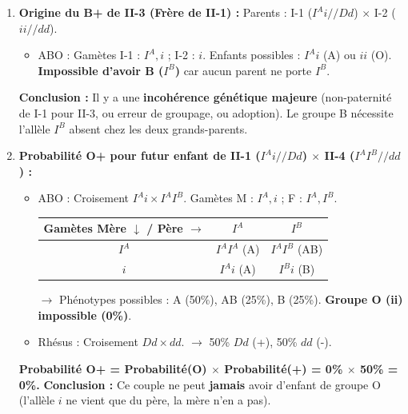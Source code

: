 \documentclass[11pt]{article}
\begin{document}
\begin{exoresolu}
\begin{enumerate}
\begin{itemize}
\begin{itemize}
                \item ABO : Phénotype B. Parents : $I^A i \times I^A I^B$. Pour être B, il faut $I^B$ (venant de II-4) et $i$ (venant de II-1). $\rightarrow$ \textbf{$I^B i$} (Certitude).
                \item Rhésus : Phénotype +. Parents : $Dd \times dd$. Enfant + $\rightarrow$ $Dd$. $\rightarrow$ \textbf{$Dd$}.
            \end{itemize}
            $\rightarrow$ \textbf{III-2 : $I^B i // Dd$}.
    \end{itemize}
    \item \textbf{Origine du B+ de II-3 (Frère de II-1) :} 
    Parents : I-1 ($I^A i // Dd$) $\times$ I-2 ($ii // dd$).
    \begin{itemize}
        \item ABO : Gamètes I-1 : $I^A, i$ ; I-2 : $i$. Enfants possibles : $I^A i$ (A) ou $ii$ (O). \textbf{Impossible d'avoir B ($I^B$)} car aucun parent ne porte $I^B$.
    \end{itemize}
    \textbf{Conclusion :} Il y a une \textbf{incohérence génétique majeure} (non-paternité de I-1 pour II-3, ou erreur de groupage, ou adoption). Le groupe B nécessite l'allèle $I^B$ absent chez les deux grands-parents.
    \item \textbf{Probabilité O+ pour futur enfant de II-1 ($I^A i // Dd$) $\times$ II-4 ($I^A I^B // dd$) :}
    \begin{itemize}
        \item ABO : Croisement $I^A i \times I^A I^B$. Gamètes M : $I^A, i$ ; F : $I^A, I^B$.
            \begin{center}
            \begin{tabular}{|c|c|c|}\hline 
            \textbf{Gamètes Mère $\downarrow$ / Père $\rightarrow$} & \textbf{$I^A$} & \textbf{$I^B$} \\ \hline 
            \textbf{$I^A$} & $I^A I^A$ (A) & $I^A I^B$ (AB) \\ \hline 
            \textbf{$i$} & $I^A i$ (A) & $I^B i$ (B) \\ \hline \end{tabular}
            \end{center}
            $\rightarrow$ Phénotypes possibles : A (50\%), AB (25\%), B (25\%). \textbf{Groupe O (ii) impossible (0\%)}. 
        \item Rhésus : Croisement $Dd \times dd$. $\rightarrow$ 50\% $Dd$ (+), 50\% $dd$ (-).
    \end{itemize}
    \textbf{Probabilité O+ = Probabilité(O) $\times$ Probabilité(+) = 0\% $\times$ 50\% = \textbf{0\%}.}
    \textbf{Conclusion :} Ce couple ne peut \textbf{jamais} avoir d'enfant de groupe O (l'allèle $i$ ne vient que du père, la mère n'en a pas).
\end{enumerate}
\end{exoresolu}
\end{document}
